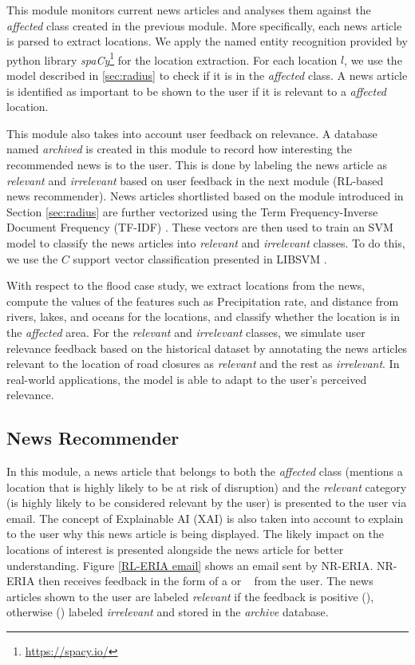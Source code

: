 \documentclass[
]{ceurart}
\newcommand{\cmark}{\ding{51}}
\newcommand{\xmark}{\ding{55}}
\begin{document}
This module monitors current news articles and analyses them against the \emph{affected} class created in the previous module. More specifically, each news article is parsed to extract locations. We apply the named entity recognition provided by python library \textit{spaCy}\footnote{\url{https://spacy.io/}} for the location extraction. For each location $l$, we use the model described in \ref{sec:radius} to check if it is in the \emph{affected} class. A news article is identified as important to be shown to the user if it is relevant to a \textit{affected} location.

This module also takes into account user feedback on relevance. A database named \emph{archived} is created in this module to record how interesting the recommended news is to the user. This is done by labeling the news article as \emph{relevant} and \emph{irrelevant} based on user feedback in the next module (RL-based news recommender). News articles shortlisted based on the module introduced in Section \ref{sec:radius} are further vectorized using the Term Frequency-Inverse Document Frequency (TF-IDF) \cite{sammut2011encyclopedia}. 
These vectors are then used to train an SVM model to classify the news articles into \textit{relevant} and \textit{irrelevant} classes. To do this, we use the $C$ support vector classification presented in LIBSVM \cite{chang2011libsvm}. 

With respect to the flood case study, we extract locations from the news, compute the values of the features such as Precipitation rate, and distance from rivers, lakes, and oceans for the locations, and classify whether the location is in the \textit{affected} area.
For the \textit{relevant} and \textit{irrelevant} classes, we simulate user relevance feedback based on the historical dataset by annotating the news articles relevant to the location of road closures as \textit{relevant} and the rest as \textit{irrelevant}. In real-world applications, the model is able to adapt to the user's perceived relevance. 

\subsection {News Recommender}

In this module, a news article that belongs to both the \emph{affected} class (mentions a location that is highly likely to be at risk of disruption) and the \emph{relevant} category (is highly likely to be considered relevant by the user) is presented to the user via email. The concept of Explainable AI (XAI) \cite{gunning2019xai} is also taken into account to explain to the user why this news article is being displayed. The likely impact on the locations of interest is presented alongside the news article for better understanding. Figure \ref{RL-ERIA email} shows an email sent by NR-ERIA. NR-ERIA then receives feedback in the form of a \cmark or \xmark~ from the user. The news articles shown to the user are labeled \emph{relevant} if the feedback is positive (\cmark), otherwise (\xmark) labeled \emph{irrelevant} and stored in the \emph{archive} database.
\end{document}
